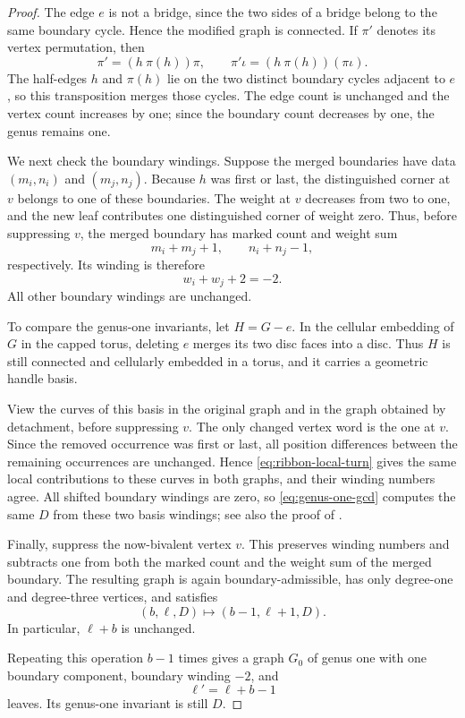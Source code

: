 \documentclass[11pt]{amsart}
\theoremstyle{definition}
\theoremstyle{plain}
\theoremstyle{definition}
\theoremstyle{definition}
\begin{document}
\begin{proof}
The edge $e$ is not a bridge, since the two sides of
a bridge belong to the same boundary cycle.
Hence the modified graph is connected.
If $\pi'$ denotes its vertex permutation, then
\[
 \pi'=(h\ \pi(h))\pi,
 \qquad
 \pi'\iota=(h\ \pi(h))(\pi\iota).
\]
The half-edges $h$ and $\pi(h)$ lie on the two distinct
boundary cycles adjacent to $e$, so this transposition
merges those cycles.
The edge count is unchanged and the vertex count
increases by one; since the boundary count decreases
by one, the genus remains one.

We next check the boundary windings.
Suppose the merged boundaries have data
$(m_i,n_i)$ and $(m_j,n_j)$.
Because $h$ was first or last, the distinguished corner
at $v$ belongs to one of these boundaries.
The weight at $v$ decreases from two to one, and the
new leaf contributes one distinguished corner of
weight zero.
Thus, before suppressing $v$, the merged boundary has
marked count and weight sum
\[
 m_i+m_j+1,
 \qquad
 n_i+n_j-1,
\]
respectively.
Its winding is therefore
\[
 w_i+w_j+2=-2.
\]
All other boundary windings are unchanged.

To compare the genus-one invariants, let $H=G-e$.
In the cellular embedding of $G$ in the capped torus,
deleting $e$ merges its two disc faces into a disc.
Thus $H$ is still connected and cellularly embedded
in a torus, and it carries a geometric handle basis.

View the curves of this basis in the original graph
and in the graph obtained by detachment, before
suppressing $v$.
The only changed vertex word is the one at $v$.
Since the removed occurrence was first or last,
all position differences between the remaining
occurrences are unchanged.
Hence \eqref{eq:ribbon-local-turn} gives the same
local contributions to these curves in both graphs,
and their winding numbers agree.
All shifted boundary windings are zero, so
\eqref{eq:genus-one-gcd} computes the same $D$ from
these two basis windings; see also the proof of
\cite[Theorem~7.4]{AmiotPlamondonSchroll}.

Finally, suppress the now-bivalent vertex $v$.
This preserves winding numbers and subtracts one
from both the marked count and the weight sum of
the merged boundary.
The resulting graph is again boundary-admissible,
has only degree-one and degree-three vertices,
and satisfies
\[
 (b,\ell,D)\longmapsto(b-1,\ell+1,D).
\]
In particular, $\ell+b$ is unchanged.

Repeating this operation $b-1$ times gives a graph
$G_0$ of genus one with one boundary component,
boundary winding $-2$, and
\[
 \ell'=\ell+b-1
\]
leaves.
Its genus-one invariant is still $D$.


\end{proof}
\end{document}
